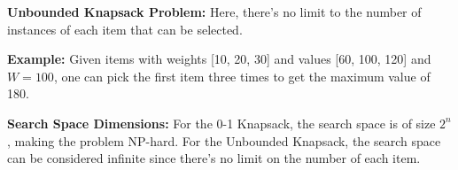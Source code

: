   \textbf{Unbounded Knapsack Problem:}
  Here, there's no limit to the number of instances of each item that can be selected.

  \textbf{Example:}
  Given items with weights [10, 20, 30] and values [60, 100, 120] and \(W = 100\), one can pick the first item three times to get the maximum value of 180.

  \textbf{Search Space Dimensions:}
  For the 0-1 Knapsack, the search space is of size \(2^n\), making the problem NP-hard. For the Unbounded Knapsack, the search space can be considered infinite since there's no limit on the number of each item.
